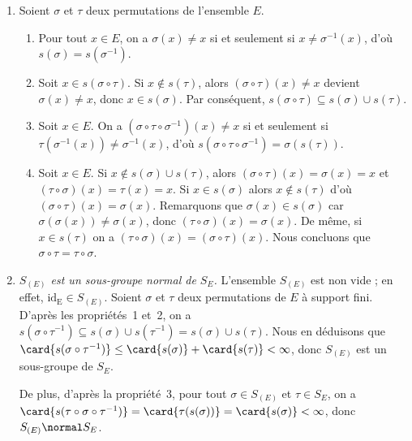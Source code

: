 \begin{enumerate}
  \item %
    Soient $\sigma$ et $\tau$ deux permutations de l'ensemble $E$.
    \begin{enumerate}[1)]
      \item %
        Pour tout $x\in E$, on a $\sigma(x)\neq x$ si et seulement si $x\neq \sigma^{-1}(x)$, d'où $s(\sigma) = s(\sigma^{-1})$.

      \item %
        Soit $x\in s(\sigma\circ\tau)$. Si $x\notin s(\tau)$, alors $(\sigma\circ\tau)(x) \neq x$ devient $\sigma(x)\neq x$, donc $x\in s(\sigma)$. 
        Par conséquent, $s(\sigma\circ\tau)\subseteq s(\sigma)\cup s(\tau)$.

      \item %
        Soit $x\in E$.
        On a $(\sigma\circ\tau\circ\sigma^{-1})(x) \neq x$ si et seulement si $\tau(\sigma^{-1}(x)) \neq \sigma^{-1}(x)$, d'où $s(\sigma\circ\tau\circ\sigma^{-1}) = \sigma(s(\tau))$.

      \item %
        Soit $x\in E$. 
        Si $x\notin s(\sigma)\cup s(\tau)$, alors $(\sigma\circ\tau)(x) = \sigma(x) = x$ et $(\tau\circ\sigma)(x) = \tau(x) = x$.
        Si $x\in s(\sigma)$ alors $x\notin s(\tau)$ d'où $(\sigma\circ\tau)(x) = \sigma(x)$.
        Remarquons que $\sigma(x)\in s(\sigma)$ car $\sigma(\sigma(x)) \neq \sigma(x)$, donc $(\tau\circ\sigma)(x) = \sigma(x)$.
        De même, si $x\in s(\tau)$ on a $(\tau\circ\sigma)(x) = (\sigma\circ\tau)(x)$.  
        Nous concluons que $\sigma\circ\tau = \tau\circ\sigma$.
    \end{enumerate}

  \item %
    \emph{$S_{(E)}$ est un sous-groupe normal de $S_E$.}
    L'ensemble $S_{(E)}$ est non vide ; en effet, $\mathrm{id_E}\in S_{(E)}$.
    Soient $\sigma$ et $\tau$ deux permutations de $E$ à support fini.
    D'après les propriétés~1 et~2, on a $s(\sigma\circ\tau^{-1})\subseteq s(\sigma)\cup s(\tau^{-1})=s(\sigma)\cup s(\tau)$. 
    Nous en déduisons que $\card{s(\sigma\circ\tau^{-1})}\leq \card{s(\sigma)} + \card{s(\tau)} < \infty$, donc $S_{(E)}$ est un sous-groupe de $S_E$.  
    
    De plus, d'après la propriété~3, pour tout $\sigma\in S_{(E)}$ et $\tau\in S_E$, on a $\card{s(\tau\circ\sigma\circ\tau^{-1})} = \card{\tau(s(\sigma))} = \card{s(\sigma)} < \infty$, donc $S_{(E)}\normal S_E$.


\end{enumerate}
